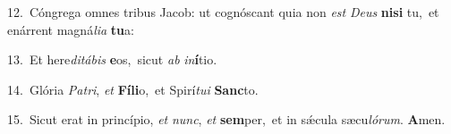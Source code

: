 {\numbfont\textcolor{\numbcolor}{12.}}~Cóngrega omnes tribus Jacob: ut cognóscant quia non \textit{est} \textit{De}\-\textit{us} \textbf{ni}\-\textbf{si} tu,~\star et enárrent magná\-\textit{li}\-\textit{a} \textbf{tu}\-a:\par
{\numbfont\textcolor{\numbcolor}{13.}}~Et here\-\textit{di}\-\textit{tá}\textit{bis} \textbf{e}\-os,~\star sicut \textit{ab} \textit{in}\-\textbf{í}tio.\par
{\numbfont\textcolor{\numbcolor}{14.}}~Glória \textit{Pa}\-\textit{tri}, \textit{et} \textbf{Fí}\-\textbf{li}o,~\star et Spirí\-\textit{tu}\-\textit{i} \textbf{Sanc}\-to.\par
{\numbfont\textcolor{\numbcolor}{15.}}~Sicut erat in princípio, \textit{et} \textit{nunc}\-, \textit{et} \textbf{sem}\-per,~\star et in sǽcula sæcu\-\textit{ló}\-\textit{rum}. \textbf{A}\-men.\par
